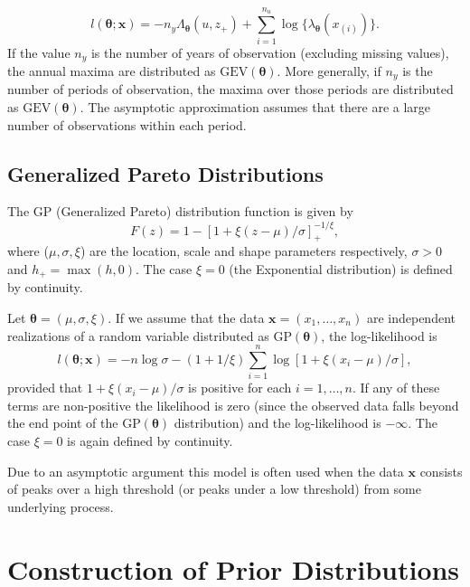 \documentclass[11pt,a4paper]{article}
\newcommand{\bs}{\boldsymbol}
\begin{document}
\begin{equation}
  l(\bs{\theta} ; \bs{x}) = -n_y\Lambda_{\bs{\theta}}(u,z_+) +
  \sum_{i=1}^{n_u} \log\{\lambda_{\bs{\theta}}(x_{(i)})\}. 
\label{pplik}
\end{equation}
If the value $n_y$ is the number of years of observation (excluding
missing values), the annual maxima are distributed as
$\text{GEV}(\bs{\theta})$.  More generally, if $n_y$ is the number of
periods of observation, the maxima over those periods are distributed
as $\text{GEV}(\bs{\theta})$.  The asymptotic approximation assumes
that there are a large number of observations within each period.

\subsection{Generalized Pareto Distributions}
\label{lhgp}

The GP (Generalized Pareto) distribution function is given by
\begin{equation}
  \label{gp}
  F(z) = 1 - \left[ 1+ \xi \left( z-\mu \right) /\sigma
    \right]_{+}^{-1/\xi} , 
\end{equation}   
where ($\mu,\sigma,\xi$) are the location, scale and shape parameters
respectively, $\sigma > 0$ and $h_{+}=\max(h,0)$.  The case $\xi=0$
(the Exponential distribution) is defined by continuity.

Let $\bs{\theta} = (\mu,\sigma,\xi)$.  If we assume that the data
$\bs{x} = (x_1,\dots,x_n)$ are independent realizations of a random
variable distributed as $\text{GP}(\bs{\theta})$, the log-likelihood
is
\begin{equation}
  l(\bs{\theta};\bs{x}) = -n\log \sigma - (1 + 1/\xi) \sum_{i=1}^n
  \log\left[1+ \xi \left( x_i-\mu \right) /\sigma\right], 
\label{gplik}
\end{equation}
provided that $1 + \xi \left( x_i-\mu \right) /\sigma$ is positive for
each $i=1,\dots,n$.  If any of these terms are non-positive the
likelihood is zero (since the observed data falls beyond the end point
of the $\text{GP}(\bs{\theta})$ distribution) and the log-likelihood
is $-\infty$.  The case $\xi=0$ is again defined by continuity.
  
Due to an asymptotic argument \citep[e.g.][]{cole01} this model is
often used when the data $\bs{x}$ consists of peaks over a high
threshold (or peaks under a low threshold) from some underlying
process.


\section{Construction of Prior Distributions}
\setcounter{footnote}{0}
\label{prior}
\end{document}

